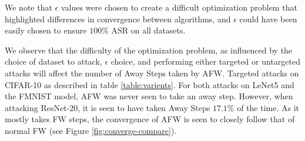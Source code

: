 \documentclass{article}
\begin{document}
\begin{table}[H]
    \centering
    \caption{Attack Success Rate (ASR) and Average Iterations of Frank-Wolfe Algorithm and Variants for Targeted Adversarial Attacks on 500 Examples from Three Datasets with $20$ maximum iterations and decaying step-size rule.}
	\label{table:varients}
\end{table}
We note that $\epsilon$ values were chosen to create a difficult optimization problem that highlighted differences in convergence between algorithms, and $\epsilon$ could have been easily chosen to ensure $100\%$ ASR on all datasets.

We observe that the difficulty of the optimization problem, as influenced by the choice of dataset to attack, $\epsilon$ choice, and performing either targeted or untargeted attacks will affect the number of Away Steps taken by AFW. Targeted attacks on CIFAR-10 as described in table \ref{table:varients}. For both attacks on LeNet5 and the FMNIST model, AFW was never seen to take an away step. However, when attacking ResNet-20, it is seen to have taken Away Steps $17.1\%$ of the time. As it mostly takes FW steps, the convergence of AFW is seen to closely follow that of normal FW (see Figure \ref{fig:converge-compare}).	
\end{document}
